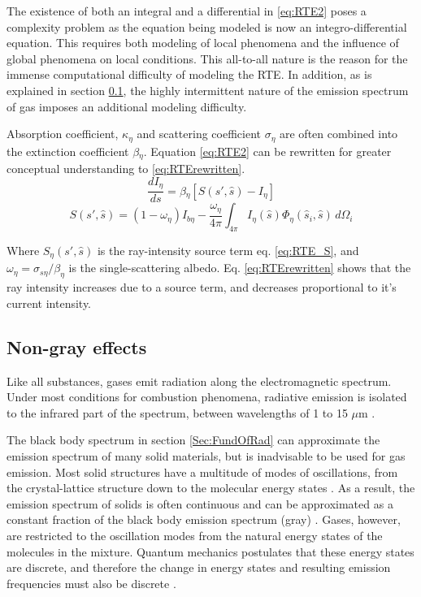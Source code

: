 The existence of both an integral and a differential in \ref{eq:RTE2} poses a complexity problem as the equation being modeled is now an integro-differential equation. 
This requires both modeling of local phenomena and the influence of global phenomena on local conditions. 
This all-to-all nature is the reason for the immense computational difficulty of modeling the RTE. 
In addition, as is explained in section \ref{Sec:Nongray}, the highly intermittent nature of the emission spectrum of gas imposes an additional modeling difficulty.

Absorption coefficient, $\kappa_{\eta{}}$ and scattering coefficient $\sigma{}_\eta{}$ are often combined into the extinction coefficient $\beta{}_\eta{}$. Equation \ref{eq:RTE2} can be rewritten for greater conceptual understanding to \ref{eq:RTErewritten}.
\begin{equation}
    \frac{dI_\eta{}}{ds} = \beta{}_\eta{}[S(s',\hat{s})-I_\eta{}]
    \label{eq:RTErewritten}
\end{equation}
\begin{equation}
    S(s',\hat{s}) = (1-\omega{}_\eta{})I_{b\eta{}}-\frac{\omega{}_\eta{}}{4\pi}\int_{4\pi{}}{I_\eta{}(\hat{s})\Phi_\eta{}(\hat{s}_i,\hat{s})}\,d\Omega{}_i
    \label{eq:RTE_S}
\end{equation}

Where $S_\eta{}(s',\hat{s})$ is the ray-intensity source term eq. \ref{eq:RTE_S}, and $\omega{}_\eta{}=\sigma{}_{s\eta{}}/\beta_{\eta{}}$ is the single-scattering albedo. Eq. \ref{eq:RTErewritten} shows that the ray intensity increases due to a source term, and decreases proportional to it's current intensity.

\subsection{Non-gray effects}\label{Sec:Nongray}
Like all substances, gases emit radiation along the electromagnetic spectrum. Under most conditions for combustion phenomena, radiative emission is isolated to the infrared part of the spectrum, between wavelengths of 1 to 15 $\mu{}$m \cite{Liu2020TheFlames}.

The black body spectrum in section \ref{Sec:FundOfRad} can approximate the emission spectrum of many solid materials, but is inadvisable to be used for gas emission. 
Most solid structures have a multitude of modes of oscillations, from the crystal-lattice structure down to the molecular energy states \cite{Viskanta1975HeatSolids}. As a result, the emission spectrum of solids is often continuous and can be approximated as a constant fraction of the black body emission spectrum (gray) \cite{Howell2010ThermalTransfer}. 
Gases, however, are restricted to the oscillation modes from the natural energy states of the molecules in the mixture. Quantum mechanics postulates that these energy states are discrete, and therefore the change in energy states and resulting emission frequencies must also be discrete \cite{Hanson2016SpectroscopyGases}.



